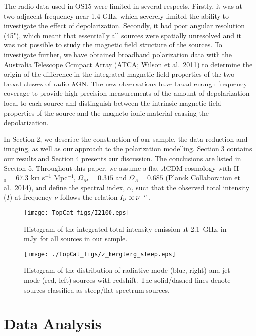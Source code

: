 \documentclass{mnras}
\begin{document}
The radio data used in OS15 were limited in several respects. Firstly, it was at two adjacent frequency near 1.4 GHz, which severely limited the ability to investigate the effect of depolarization. Secondly, it had poor angular resolution (45"), which meant that essentially all sources were spatially unresolved and it was not possible to study the magnetic field structure of the sources. To investigate further, we have obtained broadband polarization data with the Australia Telescope Compact Array (ATCA; Wilson et al.~2011) to determine the origin of the difference in the integrated magnetic field properties of the two broad classes of radio AGN. The new observations have broad enough frequency coverage to provide high precision measurements of the amount of depolarization local to each source and 
distinguish between the intrinsic magnetic field properties of the source and the magneto-ionic material causing the depolarization. 

In Section 2, we describe the construction of our sample, the data reduction and imaging, as well as our approach to the polarization modelling. 
Section 3 contains our results and Section 4 presents our discussion. 
The conclusions are listed in Section 5. 
Throughout this paper, we assume a flat $\Lambda$CDM cosmology with 
H$_0 = 67.3$ km s$^{-1}$ Mpc$^{-1}$, 
$\Omega_M=0.315$ and $\Omega_{\Lambda}=0.685$ (Planck Collaboration et al.~2014), and define the spectral index, $\alpha$, 
such that the observed total intensity ($I$) at frequency $\nu$ follows the relation 
$I_{\nu}\propto\nu^{\rm{+}\alpha}$.


\begin{figure} 
\centering
    \texttt{[image: TopCat\_figs/I2100.eps]} 
    \caption{ {\small Histogram of the integrated total intensity emission at 2.1~GHz, in mJy, for all sources in our sample.} }
    \label{stokesi}
\end{figure}  

\begin{figure} 
\centering
    \texttt{[image: ./TopCat\_figs/z\_herglerg\_steep.eps]}
    \caption{ {\small Histogram of the distribution of radiative-mode (blue, right) and jet-mode (red, left) sources with redshift. 
    The solid/dashed lines denote sources classified as steep/flat spectrum sources. } }
    \label{zhist}
\end{figure}      

\section{Data Analysis} \label{data}
\end{document}
